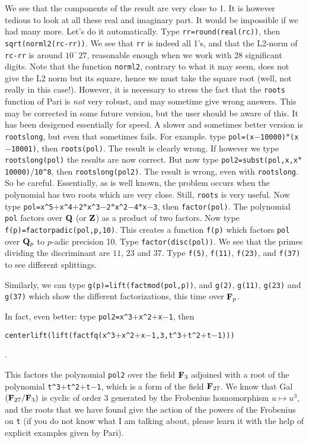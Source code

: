 We see that the components of the result are very close to 1. It is however
tedious to look at all these real and imaginary part. It would be impossible
if we had many more. Let's do it automatically. Type {\tt rr=round(real(rc))},
then {\tt sqrt(norml2(rc-rr))}. We see that {\tt rr} is indeed all 1's, and
that the L2-norm of {\tt rc-rr} is around $10^-27$, reasonable enough when we
work with 28 significant digits. Note that the function {\tt norml2}, contrary
to what it may seem, does not give the L2 norm but its square, hence we must
take the square root (well, not really in this case!).
\smallskip
However, it is necessary to stress the fact that the {\tt roots} function of
Pari is {\it not} very robust, and may sometime give wrong answers. This
may be corrected in some future version, but the user should be aware of this.
It has been desigened essentially for speed. A slower and sometimes better
version is {\tt rootslong}, but even that sometimes fails. For example. type
{\tt pol=(x$-$10000)$*$(x$-$10001)}, then {\tt roots(pol)}. The result is
clearly wrong. If however we type {\tt rootslong(pol)} the results are now
correct. But now type {\tt pol2=subst(pol,x,x$*$10000)$/$10\^{}8}, then
{\tt rootslong(pol2)}. The result is wrong, even with {\tt rootslong}. So be
careful. Essentially, as is well known, the problem occurs when the polynomial
has two roots which are very close. Still, {\tt roots} is very useful.
\smallskip
Now type {\tt pol=x\^{}5$+$x\^{}4$+$2$*$x\^{}3$-$2$*$x\^{}2$-$4$*$x$-$3},
then {\tt factor(pol)}. The polynomial {\tt pol} factors over ${\bf Q}$ (or ${\bf Z}$)
as a product of two factors. Now type {\tt f(p)=factorpadic(pol,p,10)}.
This creates a function {\tt f(p)} which factors {\tt pol} over ${\bf Q}_p$ to 
$p$-adic precision 10. Type {\tt factor(disc(pol))}. We see that the primes
dividing the discriminant are $11$, $23$ and $37$. Type {\tt f(5)}, 
{\tt f(11)}, {\tt f(23)}, and {\tt f(37)} to see different splittings.

Similarly, we can type {\tt g(p)=lift(factmod(pol,p))}, and {\tt g(2)},
{\tt g(11)}, {\tt g(23)} and {\tt g(37)} which show the different 
factorizations, this time over ${\bf F}_p$.

In fact, even better: type {\tt pol2=x\^{}3$+$x\^{}2$+$x$-$1}, then

\centerline{\tt centerlift(lift(factfq(x\^{}3$+$x\^{}2$+$x$-$1,3,t\^{}3$+$t\^{}2$+$t$-$1)))}.

This factors the polynomial {\tt pol2} over the field ${\bf F}_3$ adjoined
with a root of the polynomial {\tt t\^{}3$+$t\^{}2$+$t$-$1}, which is a form
of the field ${\bf F}_{27}$. We know that Gal$({\bf F}_{27}/{\bf F}_3)$ is cyclic of order
3 generated by the Frobenius homomorphism $u\mapsto u^3$, and the roots that
we have found give the action of the powers of the Frobenius on {\tt t}
(if you do not know what I am talking about, please learn it with the help
of explicit examples given by Pari).

